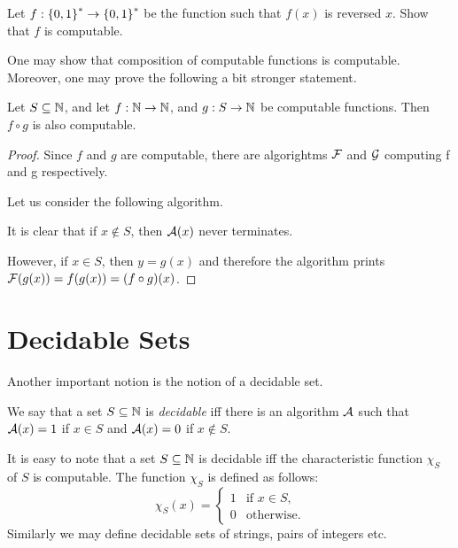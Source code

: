 \begin{exercise}
  Let $f : \strings \to \strings$ be the function such that $f(x)$ is
  reversed $x$. Show that $f$ is computable.
\end{exercise}

One may show that composition of computable functions is computable.
Moreover, one may prove the following a bit stronger statement.
\begin{theorem}
\label{theorem:composition-computable}
    Let $S \subseteq \mathbb{N}$, and let
    $f : \mathbb{N} \to \mathbb{N}$, and $g : S \to \mathbb{N}$ be computable
    functions. Then $f \circ g$ is also computable.
\end{theorem}
\begin{proof}
  Since $f$ and $g$ are computable, there are algorightms $\mathcal{F}$ and
  $\mathcal{G}$ computing f and g respectively.

  Let us consider the following algorithm.
  \begin{algorithm}
      \begin{algorithmic}[1]
              \State {}
          \EndFunction
      \end{algorithmic}
  \end{algorithm}
  It is clear that if $x \notin S$, then $\mathcal{A}(x)$ never terminates.

  However, if $x \in S$, then $y = g(x)$ and therefore the algorithm prints
  $\mathcal{F}(g(x)) = f(g(x)) = (f \circ g)(x)$.
\end{proof}

\section{Decidable Sets}
Another important notion is the notion of a decidable set.
\begin{definition}
    We say that a set $S \subseteq \mathbb{N}$ is \emph{decidable} iff there is
    an algorithm $\mathcal{A}$ such that
    $\mathcal{A}(x) = 1$ if $x \in S$ and $\mathcal{A}(x) = 0$ if
    $x \notin S$.
\end{definition}
It is easy to note that a set $S \subseteq \mathbb{N}$ is decidable iff the
characteristic function $\chi_S$ of $S$ is computable.
The function $\chi_S$ is defined as follows:
\[
    \chi_S(x) =
    \begin{cases}
        1 & \text{if } x \in S, \\
        0 & \text{otherwise}.
    \end{cases}
\]
Similarly we may define decidable sets of strings, pairs of integers etc.

